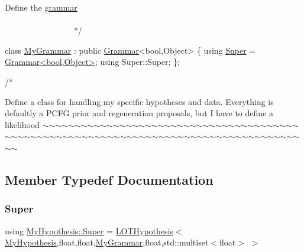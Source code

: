 \begin{DoxyCode}
    Define the \hyperlink{class_l_o_t_hypothesis_affae32db28c39df676809ae47e14e7cf}{grammar}
   ~~~~~~~~~~~~~~~~~~~~~~~~~~~~~~~~~~~~~~~~~~~~~~~~~~~~~~~~~~~~~~~~~~~~~~~~~~~~~~~~~~~~~~~~ */



\textcolor{keyword}{class }\hyperlink{class_my_grammar}{MyGrammar} : \textcolor{keyword}{public} \hyperlink{class_grammar}{Grammar}<bool,Object> \{
    \textcolor{keyword}{using} \hyperlink{class_my_hypothesis_a266742f266abc638ddc1d1870d735313}{Super} =  \hyperlink{class_grammar}{Grammar<bool,Object>};
    \textcolor{keyword}{using} Super::Super;
\};


\textcolor{comment}{/*}
\end{DoxyCode}
 Define a class for handling my specific hypotheses and data. Everything is defaultly a P\+C\+FG prior and regeneration proposals, but I have to define a likelihood $\sim$$\sim$$\sim$$\sim$$\sim$$\sim$$\sim$$\sim$$\sim$$\sim$$\sim$$\sim$$\sim$$\sim$$\sim$$\sim$$\sim$$\sim$$\sim$$\sim$$\sim$$\sim$$\sim$$\sim$$\sim$$\sim$$\sim$$\sim$$\sim$$\sim$$\sim$$\sim$$\sim$$\sim$$\sim$$\sim$$\sim$$\sim$$\sim$$\sim$$\sim$$\sim$$\sim$$\sim$$\sim$$\sim$$\sim$$\sim$$\sim$$\sim$$\sim$$\sim$$\sim$$\sim$$\sim$$\sim$$\sim$$\sim$$\sim$$\sim$$\sim$$\sim$$\sim$$\sim$$\sim$$\sim$$\sim$$\sim$$\sim$$\sim$$\sim$$\sim$$\sim$$\sim$$\sim$$\sim$$\sim$$\sim$$\sim$$\sim$$\sim$$\sim$$\sim$$\sim$$\sim$$\sim$$\sim$$\sim$ 

\subsection{Member Typedef Documentation}
\mbox{\label{class_my_hypothesis_aebf7eaf0477f8b39639e917bc87d208f}} 
\subsubsection{\texorpdfstring{Super}{Super}\hspace{0.1cm}{\footnotesize\ttfamily [1/5]}}
{\footnotesize\ttfamily using \hyperlink{class_my_hypothesis_a266742f266abc638ddc1d1870d735313}{My\+Hypothesis\+::\+Super} =  \hyperlink{class_l_o_t_hypothesis}{L\+O\+T\+Hypothesis}$<$\hyperlink{class_my_hypothesis}{My\+Hypothesis},float,float,\hyperlink{class_my_grammar}{My\+Grammar},float,std\+::multiset$<$float$>$ $>$}

